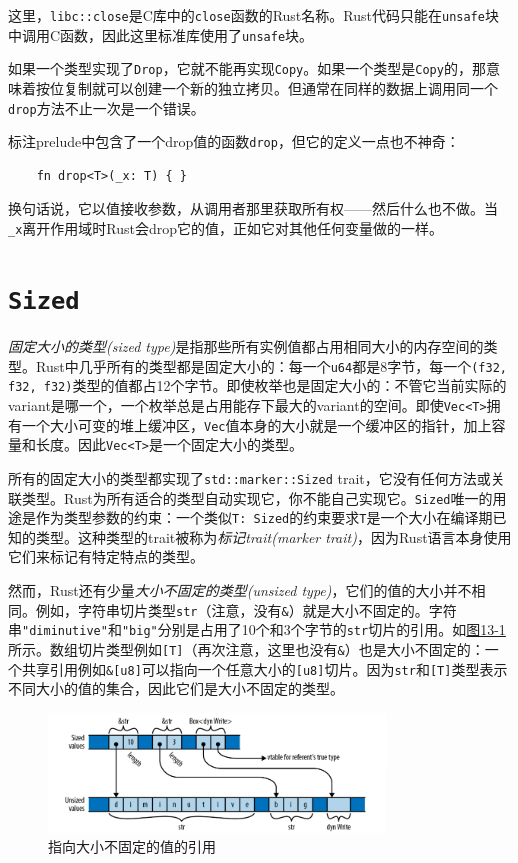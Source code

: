 这里，\texttt{libc::close}是C库中的\texttt{close}函数的Rust名称。Rust代码只能在\texttt{unsafe}块中调用C函数，因此这里标准库使用了\texttt{unsafe}块。

如果一个类型实现了\texttt{Drop}，它就不能再实现\texttt{Copy}。如果一个类型是\texttt{Copy}的，那意味着按位复制就可以创建一个新的独立拷贝。但通常在同样的数据上调用同一个\texttt{drop}方法不止一次是一个错误。

标注prelude中包含了一个drop值的函数\texttt{drop}，但它的定义一点也不神奇：
\begin{verbatim}
    fn drop<T>(_x: T) { }
\end{verbatim}

换句话说，它以值接收参数，从调用者那里获取所有权——然后什么也不做。当\texttt{\_x}离开作用域时Rust会drop它的值，正如它对其他任何变量做的一样。

\section{\texttt{Sized}}\label{sized}

\emph{固定大小的类型(sized type)}是指那些所有实例值都占用相同大小的内存空间的类型。Rust中几乎所有的类型都是固定大小的：每一个\texttt{u64}都是8字节，每一个\texttt{(f32, f32, f32)}类型的值都占12个字节。即使枚举也是固定大小的：不管它当前实际的variant是哪一个，一个枚举总是占用能存下最大的variant的空间。即使\texttt{Vec<T>}拥有一个大小可变的堆上缓冲区，\texttt{Vec}值本身的大小就是一个缓冲区的指针，加上容量和长度。因此\texttt{Vec<T>}是一个固定大小的类型。

所有的固定大小的类型都实现了\texttt{std::marker::Sized} trait，它没有任何方法或关联类型。Rust为所有适合的类型自动实现它，你不能自己实现它。\texttt{Sized}唯一的用途是作为类型参数的约束：一个类似\texttt{T: Sized}的约束要求\texttt{T}是一个大小在编译期已知的类型。这种类型的trait被称为\emph{标记trait(marker trait)}，因为Rust语言本身使用它们来标记有特定特点的类型。

然而，Rust还有少量\emph{大小不固定的类型(unsized type)}，它们的值的大小并不相同。例如，字符串切片类型\texttt{str}（注意，没有\texttt{\&}）就是大小不固定的。字符串\texttt{"diminutive"}和\texttt{"big"}分别是占用了10个和3个字节的\texttt{str}切片的引用。如\hyperref[f13-1]{图13-1}所示。数组切片类型例如\texttt{[T]}（再次注意，这里也没有\texttt{\&}）也是大小不固定的：一个共享引用例如\texttt{\&[u8]}可以指向一个任意大小的\texttt{[u8]}切片。因为\texttt{str}和\texttt{[T]}类型表示不同大小的值的集合，因此它们是大小不固定的类型。

\begin{figure}[htbp]
    \centering
    \includegraphics[width=0.8\textwidth]{../img/f13-1.png}
    \caption{指向大小不固定的值的引用}
    \label{f13-1}
\end{figure}

